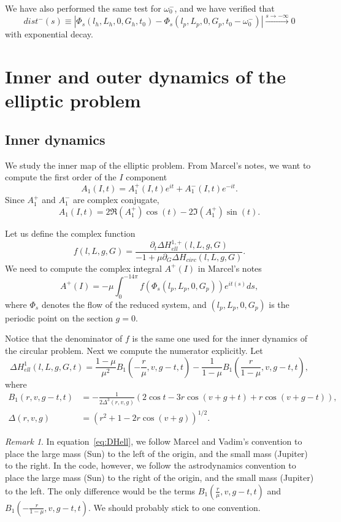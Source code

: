 \documentclass[a4paper]{amsart}
\theoremstyle{remark}
\newtheorem{rem}[thm]{Remark}
\begin{document}
We have also performed the same test for $\omega_0^-$, and we have
verified that
\[ dist^-(s) \equiv |\Phi_s(l_h,L_h,0,G_h,t_0) -
\Phi_s(l_p,L_p,0,G_p,t_0-\omega_0^-)| \xrightarrow{s\to -\infty} 0 \]
with exponential decay.

\section{Inner and outer dynamics of the elliptic problem}

\subsection{Inner dynamics}

We study the inner map of the elliptic problem. From Marcel's notes,
we want to compute the first order of the $I$ component
\[ A_1(I,t) = A_1^+(I,t)e^{it} + A_1^-(I,t)e^{-it}. \]
Since $A_1^+$ and $A_1^-$ are complex conjugate,
\[ A_1(I,t) = 2\Re(A_1^+)\cos(t) - 2\Im(A_1^+)\sin(t). \]

Let us define the complex function
\begin{equation} \label{eq:f}
f(l,L,g,G) = \frac{\partial_t \Delta H_{ell}^{1,+}(l,L,g,G)}
      {-1+\mu\partial_G \Delta H_{circ}(l,L,g,G)}.
\end{equation}
We need to compute the complex integral $A^+(I)$ in Marcel's notes
\[ A^+(I) = -\mu\int_0^{-14\pi} f(\Phi_s(l_p,L_p,0,G_p)) e^{it(s)} ds, \]
where $\Phi_s$ denotes the flow of the reduced system, and
$(l_p,L_p,0,G_p)$ is the periodic point on the section $g=0$.

Notice that the denominator of $f$ is the same one used for the inner
dynamics of the circular problem.
Next we compute the numerator explicitly.
Let 
\begin{equation} \label{eq:DHell}
\Delta H_{ell}^1(l,L,g,G,t) = 
\frac{1-\mu}{\mu^2} B_1(-\frac{r}{\mu},v,g-t,t) 
-\frac{1}{1-\mu} B_1(\frac{r}{1-\mu},v,g-t,t),
\end{equation}
where
\begin{align*} 
B_1(r,v,g-t,t) &= -\frac{1}{2\Delta^3(r,v,g)}(2\cos t
-3r\cos(v+g+t)+r\cos(v+g-t)), \\
\Delta(r,v,g) &= (r^2+1-2r\cos(v+g))^{1/2}.
\end{align*}

\begin{rem}
In equation~\eqref{eq:DHell}, we follow Marcel and Vadim's convention
to place the large mass (Sun) to the left of the origin, and the small
mass (Jupiter) to the right.
In the code, however, we follow the astrodynamics convention to place
the large mass (Sun) to the right of the origin, and the small mass
(Jupiter) to the left. The only difference would be the terms
$B_1(\frac{r}{\mu},v,g-t,t)$ and $B_1(-\frac{r}{1-\mu},v,g-t,t)$.
We should probably stick to one convention.
\end{rem}
\end{document}
